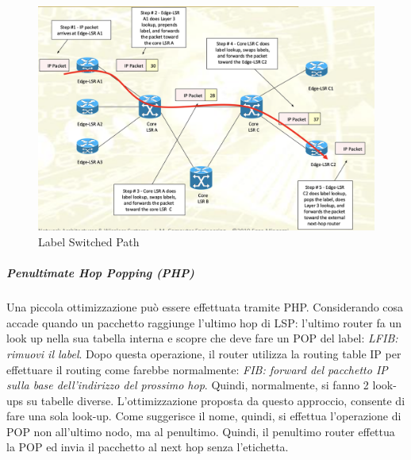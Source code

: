 \documentclass{article}
\begin{document}
\begin{figure}[H]
    \centering
    \includegraphics[scale=0.3]{figures/lsp path.png}
    \caption{Label Switched Path}
\end{figure}
\subparagraph{Penultimate Hop Popping (PHP)} Una piccola ottimizzazione può essere effettuata tramite PHP. Considerando cosa accade quando un pacchetto raggiunge l'ultimo hop di LSP: l'ultimo router fa un look up nella sua tabella interna e scopre che deve fare un POP del label: \textit{LFIB: rimuovi il label}. Dopo questa operazione, il router utilizza la routing table IP per effettuare il routing come farebbe normalmente: \textit{FIB: forward del pacchetto IP sulla base dell'indirizzo del prossimo hop}. Quindi, normalmente, si fanno 2 look-ups su tabelle diverse. L'ottimizzazione proposta da questo approccio, consente di fare una sola look-up. Come suggerisce il nome, quindi, si effettua l'operazione di POP non all'ultimo nodo, ma al penultimo. Quindi, il penultimo router effettua la POP ed invia il pacchetto al next hop senza l'etichetta.
\end{document}
